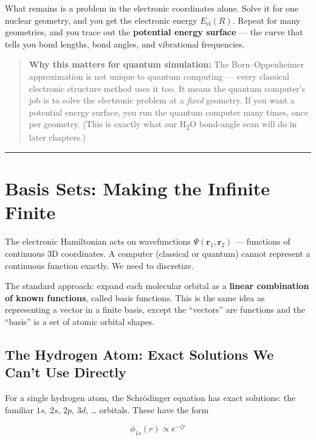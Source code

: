 \documentclass[
  11pt,
  oneside]{book}
\begin{document}
What remains is a problem in the electronic coordinates alone. Solve it
for one nuclear geometry, and you get the electronic energy
\(E_\text{el}(R)\). Repeat for many geometries, and you trace out the
\textbf{potential energy surface} --- the curve that tells you bond
lengths, bond angles, and vibrational frequencies.

\begin{quote}
\textbf{Why this matters for quantum simulation:} The Born--Oppenheimer
approximation is not unique to quantum computing --- every classical
electronic structure method uses it too. It means the quantum computer's
job is to solve the electronic problem at a \emph{fixed} geometry. If
you want a potential energy surface, you run the quantum computer many
times, once per geometry. (This is exactly what our H\textsubscript{2}O bond-angle scan
will do in later chapters.)
\end{quote}

\begin{center}\rule{0.5\linewidth}{0.5pt}\end{center}

\section{Basis Sets: Making the Infinite
Finite}\label{basis-sets-making-the-infinite-finite}

The electronic Hamiltonian acts on wavefunctions
\(\Psi(\mathbf{r}_1, \mathbf{r}_2)\) --- functions of continuous 3D
coordinates. A computer (classical or quantum) cannot represent a
continuous function exactly. We need to discretize.

The standard approach: expand each molecular orbital as a \textbf{linear
combination of known functions}, called basis functions. This is the
same idea as representing a vector in a finite basis, except the
``vectors'' are functions and the ``basis'' is a set of atomic orbital
shapes.

\subsection{The Hydrogen Atom: Exact Solutions We Can't Use
Directly}\label{the-hydrogen-atom-exact-solutions-we-cant-use-directly}

For a single hydrogen atom, the Schrödinger equation has exact
solutions: the familiar \(1s\), \(2s\), \(2p\), \(3d\), \ldots{}
orbitals. These have the form

\[\phi_{1s}(r) \propto e^{-\zeta r}\]
\end{document}
